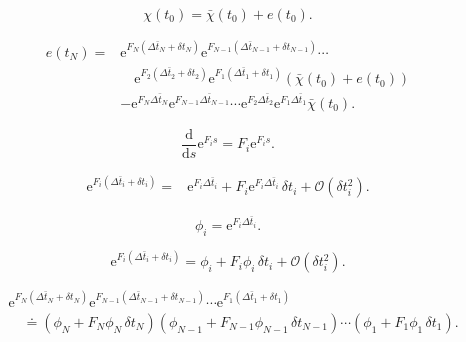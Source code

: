 \documentclass[12pt]{article}
\newcommand{\e}{\mathrm{e}}
\newcommand{\bigO}{\mathcal{O}}
\begin{document}
\begin{equation}
    \chi(t_0)=\bar\chi(t_0)+e(t_0).
    \label{eq:initial-state-decomposition}
\end{equation}

\begin{equation}
\begin{aligned}
    e(t_N)
    ={}&
    \e^{F_N(\Delta\bar t_N+\delta t_N)}
    \e^{F_{N-1}(\Delta\bar t_{N-1}+\delta t_{N-1})}
    \cdots                                                        \\
    &\quad
    \e^{F_2(\Delta\bar t_2+\delta t_2)}
    \e^{F_1(\Delta\bar t_1+\delta t_1)}
    \left(\bar\chi(t_0)+e(t_0)\right)                            \\
    &-
    \e^{F_N\Delta\bar t_N}
    \e^{F_{N-1}\Delta\bar t_{N-1}}
    \cdots
    \e^{F_2\Delta\bar t_2}
    \e^{F_1\Delta\bar t_1}
    \bar\chi(t_0).
\end{aligned}
\label{eq:exact-error}
\end{equation}

\begin{equation}
    \frac{\mathrm d}{\mathrm ds}\e^{F_i s}
    =F_i\e^{F_i s}.
    \label{eq:exponential-derivative}
\end{equation}

\begin{equation}
\begin{aligned}
    \e^{F_i(\Delta\bar t_i+\delta t_i)}
    ={}&\e^{F_i\Delta\bar t_i}
       +F_i\e^{F_i\Delta\bar t_i}\,\delta t_i
       +\bigO(\delta t_i^2).
\end{aligned}
\label{eq:single-exponential-expansion}
\end{equation}

\begin{equation}
    \phi_i=\e^{F_i\Delta\bar t_i}.
    \label{eq:phi}
\end{equation}

\begin{equation}
    \e^{F_i(\Delta\bar t_i+\delta t_i)}
    =\phi_i+F_i\phi_i\,\delta t_i+\bigO(\delta t_i^2).
    \label{eq:single-exponential-phi}
\end{equation}

\begin{equation}
\begin{aligned}
&\e^{F_N(\Delta\bar t_N+\delta t_N)}
 \e^{F_{N-1}(\Delta\bar t_{N-1}+\delta t_{N-1})}
 \cdots
 \e^{F_1(\Delta\bar t_1+\delta t_1)}                              \\
&\quad\doteq
 \left(\phi_N+F_N\phi_N\,\delta t_N\right)
 \left(\phi_{N-1}+F_{N-1}\phi_{N-1}\,\delta t_{N-1}\right)
 \cdots
 \left(\phi_1+F_1\phi_1\,\delta t_1\right).
\end{aligned}
\label{eq:product-before-expansion}
\end{equation}
\end{document}
